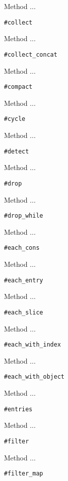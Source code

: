Method ...
\begin{verbatim}
#collect
\end{verbatim}

Method ...
\begin{verbatim}
#collect_concat
\end{verbatim}

Method ...
\begin{verbatim}
#compact
\end{verbatim}



Method ...
\begin{verbatim}
#cycle
\end{verbatim}

Method ...
\begin{verbatim}
#detect
\end{verbatim}

Method ...
\begin{verbatim}
#drop
\end{verbatim}

Method ...
\begin{verbatim}
#drop_while
\end{verbatim}

Method ...
\begin{verbatim}
#each_cons
\end{verbatim}

Method ...
\begin{verbatim}
#each_entry
\end{verbatim}

Method ... %
\begin{verbatim}
#each_slice
\end{verbatim}

Method ...
\begin{verbatim}
#each_with_index
\end{verbatim}

Method ...
\begin{verbatim}
#each_with_object
\end{verbatim}

Method ...
\begin{verbatim}
#entries
\end{verbatim}

Method ...
\begin{verbatim}
#filter
\end{verbatim}

Method ...
\begin{verbatim}
#filter_map
\end{verbatim}

